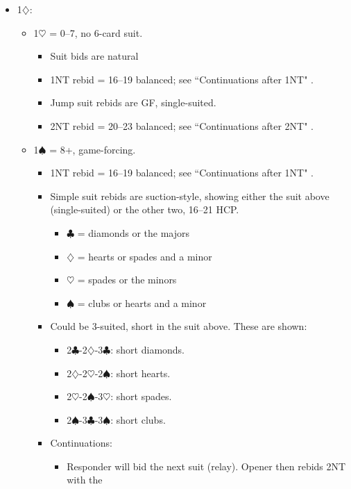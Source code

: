 \documentclass[a4paper,14pt]{extarticle}
\begin{document}
\begin{itemize}
\newpage

\item 1$\diamondsuit$:
	\begin{itemize}
   \item 1$\heartsuit$ = 0--7, no 6-card suit.
		\begin{itemize}
		\item Suit bids are natural
      \item 1NT rebid = 16--19 balanced; see ``Continuations after 1NT" .
      \item Jump suit rebids are GF, single-suited.
      \item 2NT rebid = 20--23 balanced; see ``Continuations after 2NT" .
		\end{itemize}
   \item 1$\spadesuit$ = 8+, game-forcing.
		\begin{itemize}
      \item 1NT rebid = 16--19 balanced; see ``Continuations after 1NT" .
      \item Simple suit rebids are suction-style, showing either the suit above
         (single-suited) or the other two, 16--21 HCP.
			\begin{itemize}
			\item $\clubsuit$ = diamonds or the majors
			\item $\diamondsuit$ = hearts or spades and a minor
			\item $\heartsuit$ = spades or the minors
			\item $\spadesuit$ = clubs or hearts and a minor
			\end{itemize}
		\item Could be 3-suited, short in the suit above. These are shown: 
			\begin{itemize}
         \item 2$\clubsuit$-2$\diamondsuit$-3$\clubsuit$: short diamonds.
			\item 2$\diamondsuit$-2$\heartsuit$-2$\spadesuit$: short hearts. 
			\item 2$\heartsuit$-2$\spadesuit$-3$\heartsuit$: short spades.
         \item 2$\spadesuit$-3$\clubsuit$-3$\spadesuit$: short clubs.
			\end{itemize}
		\item Continuations:
			\begin{itemize}
			\item Responder will bid the next suit (relay). Opener then rebids 2NT with the

\end{itemize}
\end{itemize}
\end{itemize}
\end{itemize}
\end{document}
